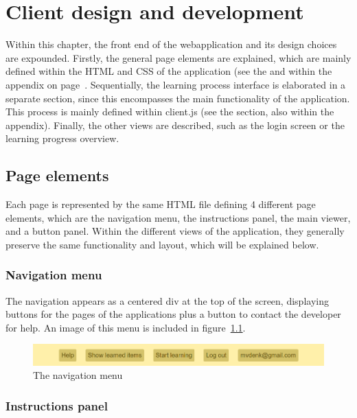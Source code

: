 \chapter{Client design and development}
\label{ch:client}

Within this chapter, the front end of the webapplication and its design choices are expounded. Firstly, the general page elements are explained, which are mainly defined within the HTML and CSS of the application (see the  and  within the  appendix on page~\pageref{app:clientsource}. Sequentially, the learning process interface is elaborated in a separate section, since this encompasses the main functionality of the application. This process is mainly defined within client.js (see the  section, also within the  appendix). Finally, the other views are described, such as the login screen or the learning progress overview.

\section{Page elements}

Each page is represented by the same HTML file defining 4 different page elements, which are the navigation menu, the instructions panel, the main viewer, and a button panel. Within the different views of the application, they generally preserve the same functionality and layout, which will be explained below.

\subsection{Navigation menu}

The navigation appears as a centered div at the top of the screen, displaying buttons for the pages of the applications plus a button to contact the developer for help. An image of this menu is included in figure~\ref{fig:navmenu}.

\begin{figure}
    \centering
    \includegraphics[width=.8\textwidth]{img/navmenu.png}
    \caption{The navigation menu}
    \label{fig:navmenu}
\end{figure}

\subsection{Instructions panel}


